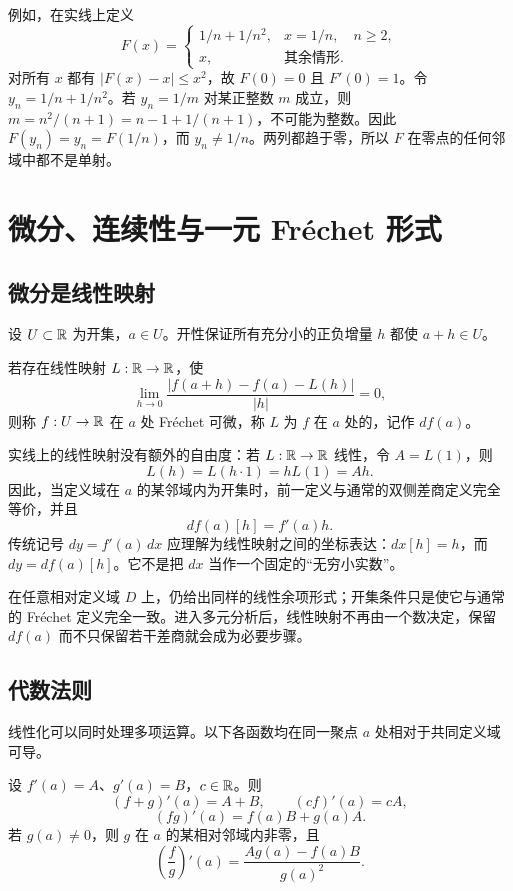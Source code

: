 例如，在实线上定义
\[
 F(x)=
 \begin{cases}
  1/n+1/n^2,&x=1/n,\quad n\ge2,\\
  x,&\text{其余情形}.
 \end{cases}
\]
对所有 \(x\) 都有 \(|F(x)-x|\le x^2\)，故 \(F(0)=0\) 且 \(F'(0)=1\)。令 \(y_n=1/n+1/n^2\)。若 \(y_n=1/m\) 对某正整数 \(m\) 成立，则 \(m=n^2/(n+1)=n-1+1/(n+1)\)，不可能为整数。因此 \(F(y_n)=y_n=F(1/n)\)，而 \(y_n\ne1/n\)。两列都趋于零，所以 \(F\) 在零点的任何邻域中都不是单射。

\section{微分、连续性与一元 Fréchet 形式}

\subsection{微分是线性映射}

设 \(U\subset\mathbb{R}\) 为开集，\(a\in U\)。开性保证所有充分小的正负增量 \(h\) 都使 \(a+h\in U\)。

\begin{definition}[一元 Fréchet 可微]
若存在线性映射 \(L:\mathbb{R}\to\mathbb{R}\)，使
\[
 \lim_{h\to0}
 \frac{|f(a+h)-f(a)-L(h)|}{|h|}=0,
\]
则称 \(f:U\to\mathbb{R}\) 在 \(a\) 处 Fréchet 可微，称 \(L\) 为 \(f\) 在 \(a\) 处的，记作 \(df(a)\)。
\end{definition}

实线上的线性映射没有额外的自由度：若 \(L:\mathbb{R}\to\mathbb{R}\) 线性，令 \(A=L(1)\)，则
\[
 L(h)=L(h\cdot1)=hL(1)=Ah.
\]
因此，当定义域在 \(a\) 的某邻域内为开集时，前一定义与通常的双侧差商定义完全等价，并且
\[
 df(a)[h]=f'(a)h.
\]
传统记号 \(dy=f'(a)\,dx\) 应理解为线性映射之间的坐标表达：\(dx[h]=h\)，而 \(dy=df(a)[h]\)。它不是把 \(dx\) 当作一个固定的“无穷小实数”。

在任意相对定义域 \(D\) 上，仍给出同样的线性余项形式；开集条件只是使它与通常的 Fréchet 定义完全一致。进入多元分析后，线性映射不再由一个数决定，保留 \(df(a)\) 而不只保留若干差商就会成为必要步骤。

\subsection{代数法则}

线性化可以同时处理多项运算。以下各函数均在同一聚点 \(a\) 处相对于共同定义域可导。

\begin{theorem}[导数的代数法则]
设 \(f'(a)=A\)、\(g'(a)=B\)，\(c\in\mathbb{R}\)。则
\[
 (f+g)'(a)=A+B,
 \qquad (cf)'(a)=cA,
\]
\[
 (fg)'(a)=f(a)B+g(a)A.
\]
若 \(g(a)\ne0\)，则 \(g\) 在 \(a\) 的某相对邻域内非零，且
\[
 \left(\frac fg\right)'(a)
 =\frac{A g(a)-f(a)B}{g(a)^2}.
\]
\end{theorem}

